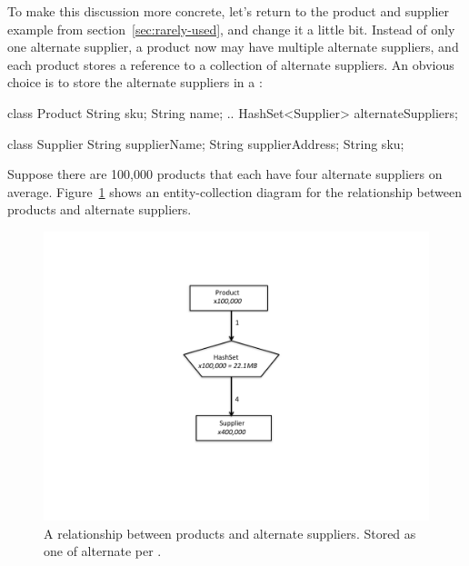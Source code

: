To make this discussion more concrete, let's return to the product and supplier example 
from section~\ref{sec:rarely-used}, and change it a little
 bit. Instead of only one alternate supplier, a product now may have multiple
 alternate suppliers, and each product stores a reference to a collection of alternate suppliers. An obvious choice is
 to store the alternate suppliers in a :
 \begin{shortlisting} 
class Product {
	String sku;
	String name;
	.. 
	HashSet<Supplier> alternateSuppliers;
}

class Supplier {
	String supplierName;
	String supplierAddress;
	String sku;
}
\end{shortlisting}


Suppose there are 100,000 products that each have four alternate suppliers on
average. Figure~\ref{fig:product-hashset} shows an entity-collection diagram for
the relationship between products and alternate suppliers.
 \begin{figure}
  \centering
 \includegraphics[width=.80\textwidth]{part1/Figures/collections/product-hashset.pdf}
 \caption{A relationship between products and alternate suppliers.
  Stored as one
   of alternate  per .}
  \label{fig:product-hashset}
\end{figure}


